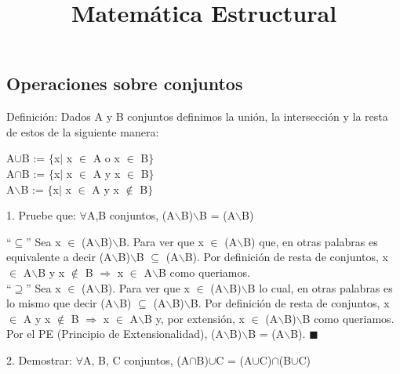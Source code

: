 \documentclass[12pt]{article}
\title{Matemática Estructural}
\begin{document}
 
\maketitle

\subsection{Operaciones sobre conjuntos}

Definición: Dados A y B conjuntos definimos la unión, la intersección y la resta de estos
de la siguiente manera:

\begin{center} A$\cup$B := $\{$x$|$ x $\in$ A o x $\in$ B$\}$\\ 
A$\cap$B := $\{$x$|$ x $\in$ A y x $\in$ B$\}$\\
A$\backslash$B := $\{$x$|$ x $\in$ A y x $\notin$ B$\}$
\end{center}
1. Pruebe que: $\forall$A,B conjuntos, (A$\backslash$B)$\backslash$B = (A$\backslash$B)\\
\begin{center}
``$\subseteq$'' Sea x $\in$ (A$\backslash$B)$\backslash$B. Para ver que x $\in$ (A$\backslash$B) que, en otras palabras es equivalente a decir (A$\backslash$B)$\backslash$B $\subseteq$ (A$\backslash$B). Por definición de resta de conjuntos, x $\in$ A$\backslash$B
y x $\notin$ B $\Longrightarrow$ x $\in$ A$\backslash$B como queriamos.\\
``$\supseteq$'' Sea x $\in$ (A$\backslash$B). Para ver que x $\in$ (A$\backslash$B)$\backslash$B lo cual, en otras palabras es lo
mismo que decir (A$\backslash$B) $\subseteq$ (A$\backslash$B)$\backslash$B. Por definición de resta de conjuntos, x $\in$ A y x $\notin$ B $\Longrightarrow$ x $\in$ A$\backslash$B y, por extensión, x $\in$ (A$\backslash$B)$\backslash$B como queriamos.\\
Por el PE (Principio de Extensionalidad), (A$\backslash$B)$\backslash$B = (A$\backslash$B). $\blacksquare$
\\
\end{center}
2. Demostrar: $\forall$A, B, C conjuntos, (A$\cap$B)$\cup$C = (A$\cup$C)$\cap$(B$\cup$C)
\end{document}
